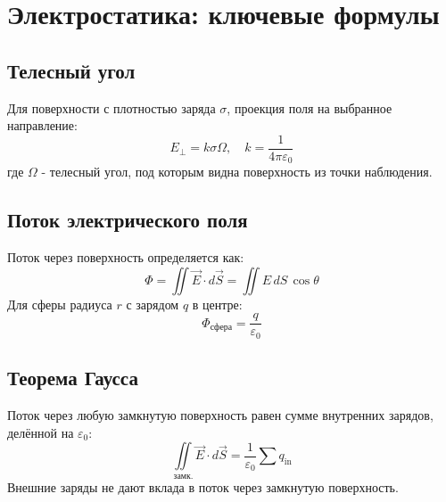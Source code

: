 \documentclass{article}
\begin{document}
\section*{Электростатика: ключевые формулы}

\subsection*{Телесный угол}
Для поверхности с плотностью заряда $\sigma$, проекция поля на выбранное направление:
\[
E_\perp = k\sigma\Omega, \quad k=\frac{1}{4\pi\varepsilon_0}
\]
где $\Omega$ - телесный угол, под которым видна поверхность из точки наблюдения.

\subsection*{Поток электрического поля}
Поток через поверхность определяется как:
\[
\Phi = \iint \vec E\cdot d\vec S = \iint E\,dS\,\cos\theta
\]
Для сферы радиуса $r$ с зарядом $q$ в центре:
\[
\Phi_{\text{сфера}}=\frac{q}{\varepsilon_0}
\]

\subsection*{Теорема Гаусса}
Поток через любую замкнутую поверхность равен сумме внутренних зарядов, делённой на $\varepsilon_0$:
\[
\boxed{\iint\limits_{\text{замк.}} \vec E\cdot d\vec S=\frac{1}{\varepsilon_0}\sum q_{\text{in}}}
\]
Внешние заряды не дают вклада в поток через замкнутую поверхность.
\end{document}
